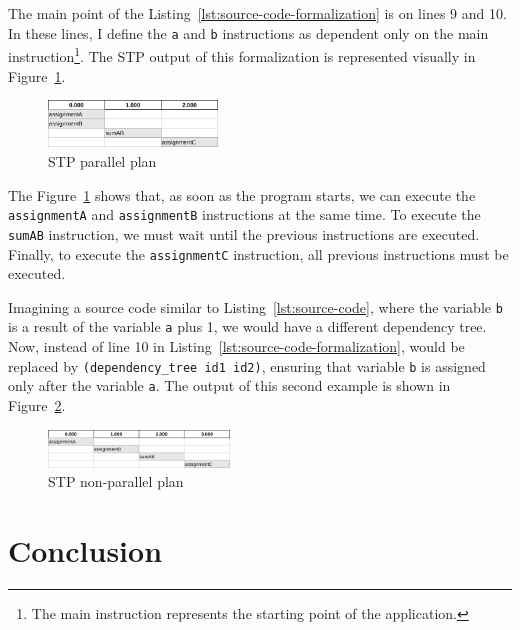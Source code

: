 \documentclass[letterpaper]{article}
\begin{document}
The main point of the Listing~\ref{lst:source-code-formalization} is on lines 9 and 10. In these lines, I define the \texttt{a} and \texttt{b} instructions as dependent only on the main instruction\footnote{The main instruction represents the starting point of the application.}. The STP output of this formalization is represented visually in Figure~\ref{fig:parallel-plan}.

\begin{figure}[h]
    \centering
    \includegraphics[width=0.4\textwidth]{./images/parallel-tasks-Parallel.png}
    \caption{STP parallel plan}
    \label{fig:parallel-plan}
\end{figure}

The Figure~\ref{fig:parallel-plan} shows that, as soon as the program starts, we can execute the \texttt{assignmentA} and \texttt{assignmentB} instructions at the same time. To execute the \texttt{sumAB} instruction, we must wait until the previous instructions are executed. Finally, to execute the \texttt{assignmentC} instruction, all previous instructions must be executed.

Imagining a source code similar to Listing~\ref{lst:source-code}, where the variable \texttt{b} is a result of the variable \texttt{a} plus 1, we would have a different dependency tree. Now, instead of line 10 in Listing~\ref{lst:source-code-formalization}, would be replaced by \texttt{(dependency\_tree\ id1\ id2)}, ensuring that variable \texttt{b} is assigned only after the variable \texttt{a}. The output of this second example is shown in Figure~\ref{fig:not-parallel-plan}.

\begin{figure}[h]
    \centering
    \includegraphics[width=0.43\textwidth]{./images/parallel-tasks-NotParallel.png}
    \caption{STP non-parallel plan}
    \label{fig:not-parallel-plan}
\end{figure}

\section{Conclusion}




\end{document}
